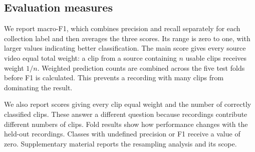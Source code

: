 \subsection{Evaluation measures}
We report macro-F1, which combines precision and recall separately for each collection label and then averages the three scores. Its range is zero to one, with larger values indicating better classification. The main score gives every source video equal total weight: a clip from a source containing $n$ usable clips receives weight $1/n$. Weighted prediction counts are combined across the five test folds before F1 is calculated. This prevents a recording with many clips from dominating the result.

We also report scores giving every clip equal weight and the number of correctly classified clips. These answer a different question because recordings contribute different numbers of clips. Fold results show how performance changes with the held-out recordings. Classes with undefined precision or F1 receive a value of zero. Supplementary material reports the resampling analysis and its scope.
